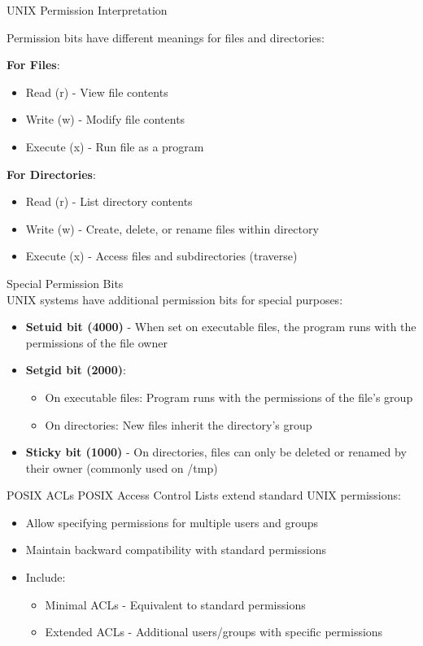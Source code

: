 \begin{KR}{UNIX Permission Interpretation}

Permission bits have different meanings for files and directories:

\textbf{For Files}:
    \begin{itemize}
        \item Read (r) - View file contents
        \item Write (w) - Modify file contents
        \item Execute (x) - Run file as a program
    \end{itemize}
\textbf{For Directories}:
    \begin{itemize}
        \item Read (r) - List directory contents
        \item Write (w) - Create, delete, or rename files within directory
        \item Execute (x) - Access files and subdirectories (traverse)
    \end{itemize}
\end{KR}


\begin{concept}{Special Permission Bits}\\
UNIX systems have additional permission bits for special purposes:
\begin{itemize}
    \item \textbf{Setuid bit (4000)} - When set on executable files, the program runs with the permissions of the file owner
    \item \textbf{Setgid bit (2000)}:
    \begin{itemize}
        \item On executable files: Program runs with the permissions of the file's group
        \item On directories: New files inherit the directory's group
    \end{itemize}
    \item \textbf{Sticky bit (1000)} - On directories, files can only be deleted or renamed by their owner (commonly used on /tmp)
\end{itemize}
\end{concept}



\begin{definition}{POSIX ACLs}
POSIX Access Control Lists extend standard UNIX permissions:
\begin{itemize}
    \item Allow specifying permissions for multiple users and groups
    \item Maintain backward compatibility with standard permissions
    \item Include:
    \begin{itemize}
        \item Minimal ACLs - Equivalent to standard permissions
        \item Extended ACLs - Additional users/groups with specific permissions
    \end{itemize}
\end{itemize}
\end{definition}

